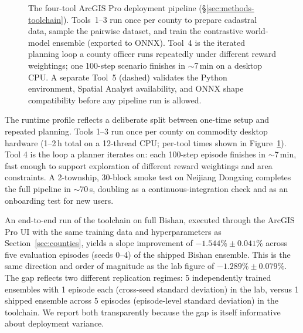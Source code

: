 \documentclass[11pt]{article}
\begin{document}
\begin{figure}[htbp]
{%
}
\caption{The four-tool ArcGIS Pro deployment pipeline (\S\ref{sec:methods-toolchain}). Tools~1--3 run once per county to prepare cadastral data, sample the pairwise dataset, and train the contrastive world-model ensemble (exported to ONNX). Tool~4 is the iterated planning loop a county officer runs repeatedly under different reward weightings; one 100-step scenario finishes in $\sim$7\,min on a desktop CPU. A separate Tool~5 (dashed) validates the Python environment, Spatial Analyst availability, and ONNX shape compatibility before any pipeline run is allowed.}
\label{fig:toolchain}
\end{figure}

The runtime profile reflects a deliberate split between one-time setup and repeated planning. Tools 1--3 run once per county on commodity desktop hardware (1--2\,h total on a 12-thread CPU; per-tool times shown in Figure~\ref{fig:toolchain}). Tool 4 is the loop a planner iterates on: each 100-step episode finishes in $\sim$7\,min, fast enough to support exploration of different reward weightings and area constraints. A 2-township, 30-block smoke test on Neijiang Dongxing completes the full pipeline in $\sim$70\,s, doubling as a continuous-integration check and as an onboarding test for new users.

An end-to-end run of the toolchain on full Bishan, executed through the ArcGIS Pro UI with the same training data and hyperparameters as Section~\ref{sec:counties}, yields a slope improvement of $-1.544\% \pm 0.041\%$ across five evaluation episodes (seeds 0--4) of the shipped Bishan ensemble. This is the same direction and order of magnitude as the lab figure of $-1.289\% \pm 0.079\%$. The gap reflects two different replication regimes: 5 independently trained ensembles with 1 episode each (cross-seed standard deviation) in the lab, versus 1 shipped ensemble across 5 episodes (episode-level standard deviation) in the toolchain. We report both transparently because the gap is itself informative about deployment variance.
\end{document}
